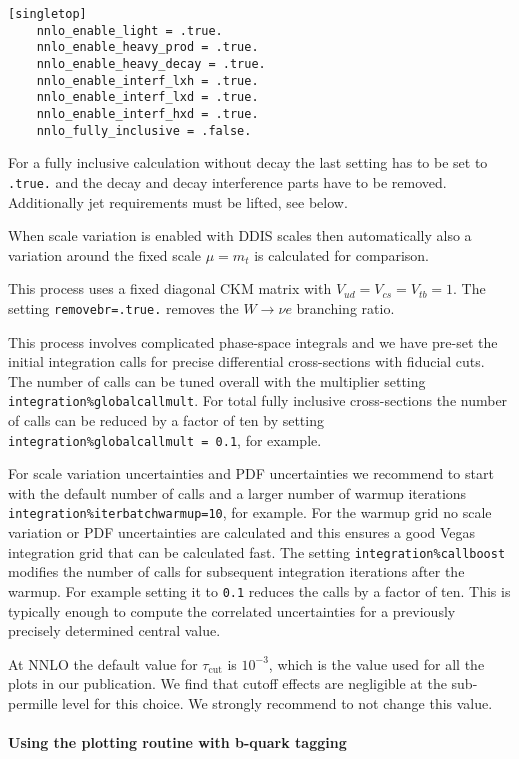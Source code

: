 \begin{verbatim}
[singletop]
    nnlo_enable_light = .true.
    nnlo_enable_heavy_prod = .true.
    nnlo_enable_heavy_decay = .true.
    nnlo_enable_interf_lxh = .true.
    nnlo_enable_interf_lxd = .true.
    nnlo_enable_interf_hxd = .true.
    nnlo_fully_inclusive = .false.
\end{verbatim}

For a fully inclusive calculation without decay the last setting has to
be set to \texttt{.true.} and the decay and decay interference parts
have to be removed. Additionally jet requirements must be lifted, see
below.

When scale variation is enabled with DDIS scales then automatically also
a variation around the fixed scale \(\mu=m_t\) is calculated for
comparison.

This process uses a fixed diagonal CKM matrix with
\(V_{ud}=V_{cs}=V_{tb}=1\). The setting \texttt{removebr=.true.} removes
the \(W\to \nu e\) branching ratio.

This process involves complicated phase-space integrals and we have
pre-set the initial integration calls for precise differential
cross-sections with fiducial cuts. The number of calls can be tuned
overall with the multiplier setting
\texttt{integration\%globalcallmult}. For total fully inclusive
cross-sections the number of calls can be reduced by a factor of ten by
setting \texttt{integration\%globalcallmult\ =\ 0.1}, for example.

For scale variation uncertainties and PDF uncertainties we recommend to
start with the default number of calls and a larger number of warmup
iterations \texttt{integration\%iterbatchwarmup=10}, for example. For
the warmup grid no scale variation or PDF uncertainties are calculated
and this ensures a good Vegas integration grid that can be calculated
fast. The setting \texttt{integration\%callboost} modifies the number of
calls for subsequent integration iterations after the warmup. For
example setting it to \texttt{0.1} reduces the calls by a factor of ten.
This is typically enough to compute the correlated uncertainties for a
previously precisely determined central value.

At NNLO the default value for \(\tau_{\text{cut}}\) is \(10^{-3}\), which
is the value used for all the plots in our publication. We find that
cutoff effects are negligible at the sub-permille level for this choice.
We strongly recommend to not change this value.

\paragraph{Using the plotting routine with b-quark
tagging}\label{using-the-plotting-routine-with-b-quark-tagging}

